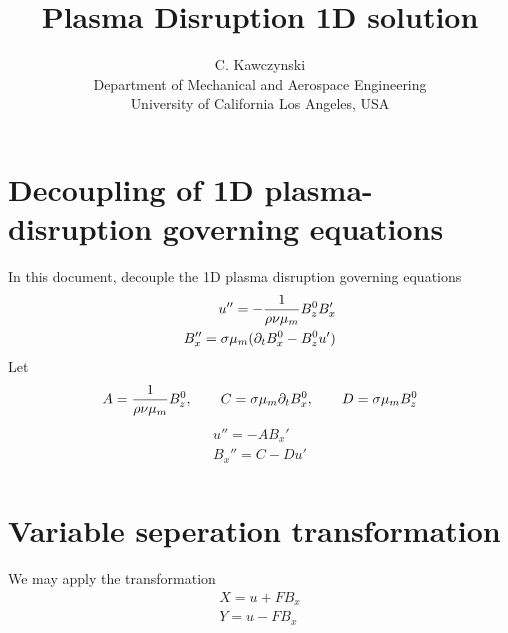 \documentclass[11pt]{article}
\begin{document}
\doublespacing
\title{Plasma Disruption 1D solution}
\author{C. Kawczynski \\
Department of Mechanical and Aerospace Engineering \\
University of California Los Angeles, USA\\
}
\maketitle

\section{Decoupling of 1D plasma-disruption governing equations}
In this document, decouple the 1D plasma disruption governing equations
\begin{equation}\begin{aligned}
u''   = - \frac{1}{\rho \nu {\mu_m}} B_z^0 B_x' \\
B_x'' = \sigma {\mu_m} (\partial_t B_x^0 - B_z^0 u') \\
\end{aligned} \end{equation}
Let
\begin{equation}\begin{aligned}
A = \frac{1}{\rho \nu {\mu_m}} B_z^0, \qquad
C = \sigma {\mu_m} \partial_t B_x^0, \qquad
D = \sigma {\mu_m} B_z^0
\end{aligned} \end{equation}
\begin{equation}\begin{aligned}
u''   = - A B_x' \\
B_x'' = C - D u' \\
\end{aligned} \end{equation}

\section{Variable seperation transformation}
We may apply the transformation
\begin{equation}\begin{aligned}
X = u + F B_x \\
Y = u - F B_x \\
\end{aligned} \end{equation}
\end{document}
